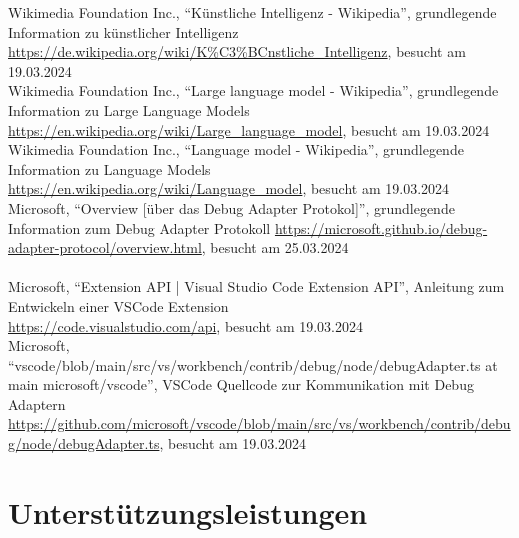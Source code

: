 \documentclass[a4paper,12pt,ngerman]{scrartcl}
\begin{document}
Wikimedia Foundation Inc.,  ``Künstliche Intelligenz - Wikipedia'', grundlegende Information zu künstlicher Intelligenz\\
\url{https://de.wikipedia.org/wiki/K\%C3\%BCnstliche_Intelligenz}, besucht am 19.03.2024\\
Wikimedia Foundation Inc.,  ``Large language model - Wikipedia'', grundlegende Information zu Large Language Models\\
\url{https://en.wikipedia.org/wiki/Large_language_model}, besucht am 19.03.2024\\
Wikimedia Foundation Inc.,  ``Language model - Wikipedia'', grundlegende Information zu Language Models \\
\url{https://en.wikipedia.org/wiki/Language_model}, besucht am 19.03.2024\\
Microsoft, ``Overview [über das Debug Adapter Protokol]'', grundlegende Information zum Debug Adapter Protokoll
\url{https://microsoft.github.io/debug-adapter-protocol/overview.html}, besucht am 25.03.2024\\
\vspace{1em}\\
Microsoft, ``Extension API | Visual Studio Code Extension API'', Anleitung zum Entwickeln einer VSCode Extension\\
\url{https://code.visualstudio.com/api}, besucht am 19.03.2024\\
Microsoft, ``vscode/blob/main/src/vs/workbench/contrib/debug/node/debugAdapter.ts at main microsoft/vscode'', VSCode Quellcode zur Kommunikation mit Debug Adaptern\\
\url{https://github.com/microsoft/vscode/blob/main/src/vs/workbench/contrib/debug/node/debugAdapter.ts}, besucht am 19.03.2024

\section{Unterstützungsleistungen}
\end{document}
